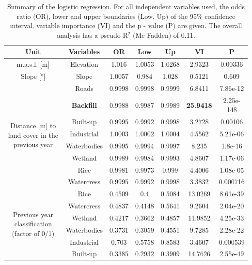 \documentclass[11pt, letterpaper, oneside]{article}
\begin{document}
\begin{table}[H]
\caption{Summary of the logistic regression. For all independent variables used, the odds ratio (OR), lower and upper boundaries (Low, Up) of the 95\% confidence interval, variable importance (VI) and the p - value (P) are given. The overall analysis has a pseudo R$^2$ (Mc Fadden) of 0.11.}
\centering
\begin{tabular}{c c c c c c c}
  \hline
 Unit & Variables & OR & Low & Up & VI & P \\ 
  \hline
m.a.s.l. [m] &  Elevation & 1.016 & 1.0053 & 1.0268 & 2.9323 & 0.00336 \\ 
Slope [°] & Slope & 1.0057 & 0.984 & 1.028 & 0.5121 & 0.609 \\ 
\hline
 \multirow{8}{3cm}{Distance [m] to land cover in the previous year} 
                    & Roads  & 0.9998 & 0.9998 & 0.9999 & 6.8411 & 7.86e-12 \\ 
                    & \textbf{Backfill}  & 0.9988 & 0.9987 & 0.9989 & \textbf{25.9418} & 2.25e-148 \\ 
                    & Built-up  & 0.9995 & 0.9992 & 0.9998 & 3.2728 & 0.00106 \\ 
                    & Industrial  & 1.0003 & 1.0002 & 1.0004 & 4.5562 & 5.21e-06 \\ 
                    & Waterbodies & 0.9995 & 0.9994 & 0.9997 & 8.235 & 1.8e-16 \\ 
                    & Wetland & 0.9989 & 0.9984 & 0.9993 & 4.8607 & 1.17e-06 \\ 
                    & Rice & 0.9981 & 0.9973 & 0.999 & 4.4006 & 1.08e-05\\ 
                    & Watercress & 0.9995 & 0.9992 & 0.9998 & 3.3832 & 0.000716 \\ 
                    \hline
\multirow{6}{3cm}{Previous year classification (factor of 0/1)} 
            & Rice & 0.4509 & 0.4 & 0.5084 & 13.0269 & 8.61e-39\\ 
            & Watercress & 0.4837 & 0.4148 & 0.5641 & 9.2604 & 2.04e-20 \\ 
            & Wetland & 0.4217 & 0.3662 & 0.4857 & 11.9852 & 4.25e-33\\ 
            & Waterbodies & 0.3731 & 0.3059 & 0.4551 & 9.7285 & 2.28e-22 \\ 
            & Industrial & 0.703 & 0.5758 & 0.8583 & 3.4607 & 0.000539  \\ 
            & Built-up & 0.3385 & 0.2932 & 0.3909 & 14.7626 & 2.55e-49 \\ 
            
   \hline
\end{tabular}

\label{tab:logreg_allyrs}
\end{table}
\end{document}

